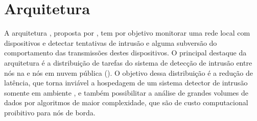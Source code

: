 
\section{Arquitetura \arch}\label{sec:cassales}

A arquitetura \arch, proposta por , tem por objetivo
monitorar uma rede local com dispositivos \iot e detectar tentativas de intrusão
e alguma subversão do comportamento das transmissões destes dispositivos.
O principal destaque da arquitetura é a distribuição de tarefas do sistema de
detecção de intrusão entre nós na  e nós em nuvem pública
(\cloud).
O objetivo dessa distribuição é a redução de latência, que torna inviável a
hospedagem de um sistema detector de intrusão somente em ambiente \cloud, e
também possibilitar a análise de grandes volumes de dados por algoritmos de
maior complexidade, que são de custo computacional proibitivo para nós de borda.

